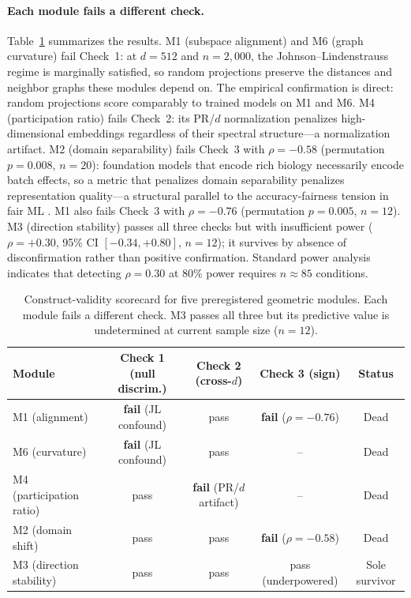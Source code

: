 \documentclass[10pt,letterpaper]{article}
\begin{document}
\paragraph{Each module fails a different check.} Table~\ref{tab:scorecard} summarizes the results. M1 (subspace alignment) and M6 (graph curvature) fail Check~1: at $d = 512$ and $n = 2{,}000$, the Johnson--Lindenstrauss regime is marginally satisfied, so random projections preserve the distances and neighbor graphs these modules depend on. The empirical confirmation is direct: random projections score comparably to trained models on M1 and M6. M4 (participation ratio) fails Check~2: its PR/$d$ normalization penalizes high-dimensional embeddings regardless of their spectral structure---a normalization artifact. M2 (domain separability) fails Check~3 with $\rho = -0.58$ (permutation $p = 0.008$, $n = 20$): foundation models that encode rich biology necessarily encode batch effects, so a metric that penalizes domain separability penalizes representation quality---a structural parallel to the accuracy-fairness tension in fair ML \citep{chouldechova2017impossibility}. M1 also fails Check~3 with $\rho = -0.76$ (permutation $p = 0.005$, $n = 12$). M3 (direction stability) passes all three checks but with insufficient power ($\rho = +0.30$, 95\% CI $[-0.34, +0.80]$, $n = 12$); it survives by absence of disconfirmation rather than positive confirmation. Standard power analysis indicates that detecting $\rho = 0.30$ at 80\% power requires $n \approx 85$ conditions.

\begin{table}[t]
\centering
\caption{Construct-validity scorecard for five preregistered geometric modules. Each module fails a different check. M3 passes all three but its predictive value is undetermined at current sample size ($n = 12$).}
\label{tab:scorecard}
\small
\begin{tabular}{@{}lcccc@{}}
\toprule
Module & Check 1 (null discrim.) & Check 2 (cross-$d$) & Check 3 (sign) & Status \\
\midrule
M1 (alignment) & \textbf{fail} (JL confound) & pass & \textbf{fail} ($\rho = -0.76$) & Dead \\
M6 (curvature) & \textbf{fail} (JL confound) & pass & -- & Dead \\
M4 (participation ratio) & pass & \textbf{fail} (PR/$d$ artifact) & -- & Dead \\
M2 (domain shift) & pass & pass & \textbf{fail} ($\rho = -0.58$) & Dead \\
M3 (direction stability) & pass & pass & pass (underpowered) & Sole survivor \\
\bottomrule
\end{tabular}
\end{table}
\end{document}
